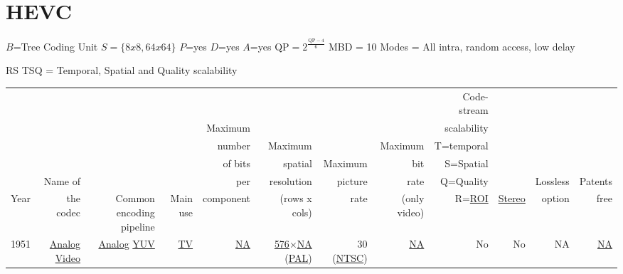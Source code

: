 \section{HEVC}

$B$=Tree Coding Unit
$S=\{8x8, 64x64\}$
$P$=yes
$D$=yes
$A$=yes
$\text{QP}=2^{\frac{\text{QP}-4}{6}}$
MBD = 10
Modes = All intra, random access, low delay

RS 
TSQ = Temporal, Spatial and Quality scalability

\begin{tabular}{lrrrrrrrrrrr}
     &           &                          &          &           &              &         &              & Code-stream & & & \\
     &           &                          &          &   Maximum &              &         &              & scalability & & & \\
     &           &                          &          &     number&      Maximum &         &      Maximum &  T=temporal & & & \\
     &           &                          &          &   of bits &      spatial & Maximum &          bit &   S=Spatial & & & \\
     &   Name of &                          &          &       per &   resolution & picture &         rate &   Q=Quality & & Lossless & Patents \\
Year & the codec & Common encoding pipeline & Main use & component &(rows x cols) &    rate & (only video) &       R=\href{https://en.wikipedia.org/wiki/Region_of_interest}{ROI} & \href{https://en.wikipedia.org/wiki/Stereoscopy}{Stereo} & option & free\\
\hline

1951 & %
\href{https://en.wikipedia.org/wiki/Video#Analog_video}{Analog Video} & %
\href{https://en.wikipedia.org/wiki/Analog_signal}{Analog} \href{https://en.wikipedia.org/wiki/YUV}{YUV} & %
\href{https://en.wikipedia.org/wiki/Television}{TV} & %
\href{https://en.wikipedia.org/wiki/N/A}{NA} & %
\href{https://en.wikipedia.org/wiki/Interlaced_video}{576}$\times$\href{https://en.wikipedia.org/wiki/N/A}{NA} (\href{https://en.wikipedia.org/wiki/PAL}{PAL}) & %
30 (\href{https://en.wikipedia.org/wiki/NTSC}{NTSC}) & %
\href{https://en.wikipedia.org/wiki/N/A}{NA} & %
No & %
No & %
NA & %
\href{https://en.wikipedia.org/wiki/N/A}{NA} \\ %


\end{tabular}
